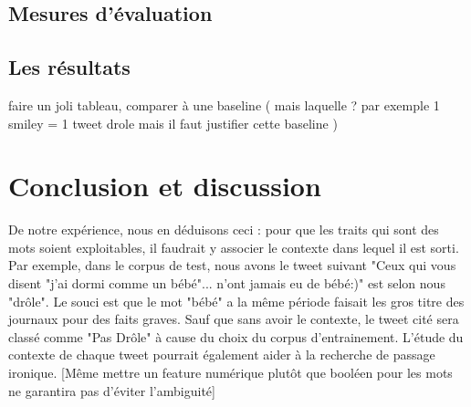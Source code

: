\documentclass[10pt,a4paper,twoside]{article}
\begin{document}
\subsection{Mesures d'évaluation}

\subsection{Les résultats}
\label{res}
faire un joli tableau, comparer à une baseline ( mais laquelle ? par exemple  1 smiley = 1 tweet drole mais il faut justifier cette baseline ) 



\section{Conclusion et discussion}

De notre expérience, nous en déduisons ceci : pour que les traits qui sont des mots soient exploitables, il faudrait y associer le contexte dans lequel il est sorti. Par exemple, dans le corpus de test, nous avons le tweet suivant "Ceux qui vous disent "j'ai dormi comme un bébé"... n'ont jamais eu de bébé:)" est selon nous "drôle". Le souci est que le mot "bébé" a la même période faisait les gros titre des journaux pour des faits graves. Sauf que sans avoir le contexte, le tweet cité sera classé comme "Pas Drôle" à cause du choix du corpus d'entrainement. L'étude du contexte de chaque tweet pourrait également aider à la recherche de passage ironique. 
[Même mettre un feature numérique plutôt que booléen pour les mots ne garantira pas d'éviter l'ambiguité]
\end{document}
